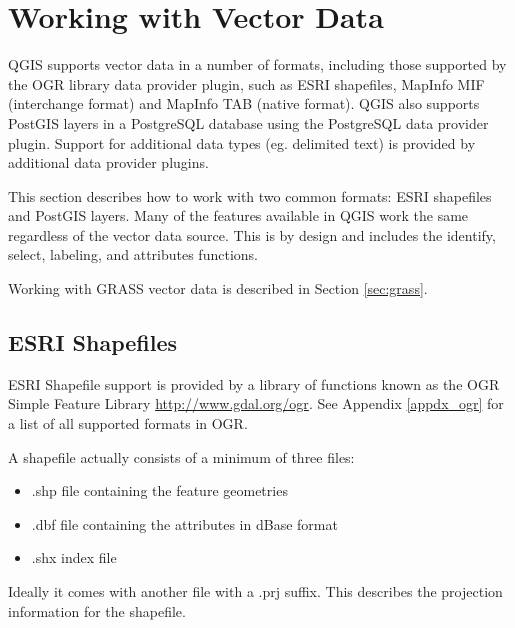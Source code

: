 
\section{Working with Vector Data}\label{label_workingvector}

QGIS supports vector data in a number of formats, including those
supported by the OGR library data provider plugin, such as ESRI shapefiles,
MapInfo MIF (interchange format)
and MapInfo TAB (native format).
QGIS also supports PostGIS
layers in a PostgreSQL database using the PostgreSQL data provider plugin.
Support for
additional data types (eg. delimited text) is provided by additional data provider plugins.

This section describes how to work with two common formats:
ESRI shapefiles and PostGIS layers. Many of the
features available in QGIS work the same regardless of the vector data source.
This is by design and includes the identify, select, labeling, and attributes
functions.

Working with GRASS vector data is described in Section \ref{sec:grass}.

\subsection{ESRI Shapefiles}

ESRI Shapefile support is provided by a library of functions known as 
the OGR Simple Feature Library \url{http://www.gdal.org/ogr}. See Appendix
\ref{appdx_ogr} for a list of all supported formats in OGR.

A shapefile actually consists of a minimum of three
files:

\begin{itemize}
\item .shp file containing the feature geometries
\item .dbf file containing the attributes in dBase format
\item .shx index file
\end{itemize}

Ideally it comes with another file with a .prj suffix. This describes
the projection information for the shapefile.

